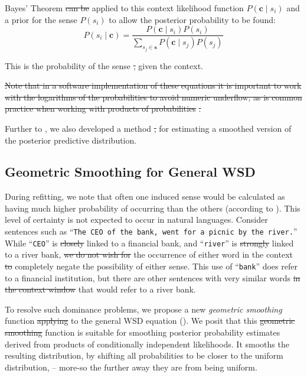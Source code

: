\documentclass{article} %
\def\parencite{\cite} %
\renewcommand{\c}{\mathbf{c}}
\newcommand{\s}{\mathbf{s}}
\newcommand{\wordquote}[1]{\enquote{\texttt{#1}}}
\providecommand{\DIFadd}[1]{{\protect\color{blue}\uwave{#1}}} %
\providecommand{\DIFdel}[1]{{\protect\color{red}\sout{#1}}}                      %
\providecommand{\DIFaddbegin}{} %
\providecommand{\DIFaddend}{} %
\providecommand{\DIFdelbegin}{} %
\providecommand{\DIFdelend}{} %
\begin{document}
Bayes' Theorem \DIFdelbegin \DIFdel{can be }\DIFdelend \DIFaddbegin \DIFadd{is }\DIFaddend applied to this context likelihood function  $P(\c \mid s_{i})$ and a prior for the sense $P(s_i)$ to allow the posterior probability to be found:
\begin{equation} \label{eq:generalwsd}
P(s_{i} \mid \c) =
\dfrac{P(\c \mid s_{i})P(s_{i})}
{\sum_{s_{j}\in\s} P(\c \mid s_{j})P(s_{j})}
\end{equation}

This is the probability of the sense \DIFdelbegin \DIFdel{, }\DIFdelend given the context.
\DIFdelbegin %

\DIFdel{Note that in a software implementation of these equations it is important to work with the logarithms of the probabilities to avoid numeric underflow; as is common practice when working with products of probabilities }%
\DIFdel{.
}%

\DIFdelend Further to , we also developed a method \DIFdelbegin \DIFdel{, }\DIFdelend for estimating a smoothed version of the posterior predictive distribution.


\subsection{Geometric Smoothing for General WSD} \label{smoothing}


During refitting, we note that often one induced sense would be calculated as having much higher probability of occurring than the others (according to ).
This level of certainty is not expected to occur in natural languages. 
Consider sentences such as \wordquote{The CEO of the bank, went for a picnic by the river.} 
While \wordquote{CEO} is \DIFdelbegin \DIFdel{closely }\DIFdelend linked to a financial bank, and \wordquote{river} is \DIFdelbegin \DIFdel{strongly }\DIFdelend linked to a river bank, \DIFdelbegin \DIFdel{we do not wish for }\DIFdelend the occurrence of either word in the context \DIFdelbegin \DIFdel{to }\DIFdelend \DIFaddbegin \DIFadd{should not }\DIFaddend completely negate the possibility of either sense.
This use of \wordquote{bank} does refer to a financial institution, but there are other sentences with very similar words \DIFdelbegin \DIFdel{in the context window }\DIFdelend that would refer to a river bank.

To resolve such dominance problems, we propose a new \emph{geometric smoothing} function \DIFdelbegin \DIFdel{applying }\DIFdelend \DIFaddbegin \DIFadd{which we apply }\DIFaddend to the general WSD equation ().
We posit that this \DIFdelbegin \DIFdel{geometric smoothing }\DIFdelend function is suitable for smoothing posterior probability estimates derived from products of conditionally independent likelihoods.
It smooths the resulting distribution, by shifting all probabilities to be closer to the uniform distribution,  -- more-so the further away they are from being uniform.
\end{document}
